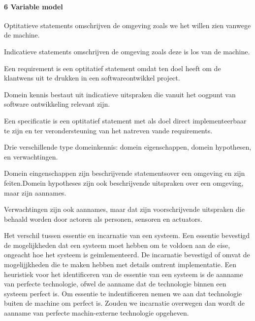 \paragraph{6 Variable model}
Optitatieve statements omschrijven de omgeving zoals we het willen zien vanwege de machine. 

Indicatieve statements omschrijven de omgeving zoals deze is los van de machine. 

Een requirement is een optitatief statement omdat ten doel heeft om de klantwens uit te drukken in een softwareontwikkel project. 

Domein kennis bestaut uit indicatieve uitspraken die vanuit het oogpunt van software ontwikkeling relevant zijn. 

Een specificatie is een optitatief statement met als doel direct implementeerbaar te zijn en ter verondersteuning van het natreven vande requirements. 

Drie verschillende type domeinkennis: domein eigenschappen, domein hypothesen, en verwachtingen. 

Domein eingenschappen  zijn beschrijvende statementsover een omgeving en zijn feiten.Domein hypotheses  zijn ook beschrijvende uitspraken over een omgeving, maar zijn aannames. 

Verwachtingen zijn ook aannames, maar dat zijn voorschrijvende uitspraken die behaald worden door actoren als personen, sensoren en actuators. 

Het verschil tussen essentie en incarnatie van een systeem. Een essentie bevestigd de  mogelijkheden dat een systeem moet hebben om te voldoen aan de eise, ongeacht hoe het systeem is geimlementeerd. De incarnatie bevestigd of omvat de mogelijjkheden die te maken hebben met details omtrent implementatie. Een heuristiek voor het identificeren van de essentie van een systeem is de aanname van perfecte technologie, ofwel de aanname dat de technologie binnen een systeem perfect is. Om essentie te indentificeren nemen we aan dat technologie buiten de machine om perfect is. Zouden we incarnatie overwegen dan wordt de aanname van perfecte machin-externe technologie opgeheven. 

